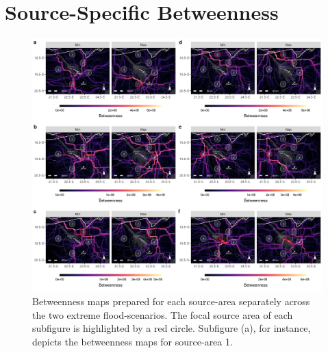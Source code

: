 \documentclass[abstract=on,10pt,a4paper,bibliography=totocnumbered]{article}
\begin{document}
\section{Source-Specific Betweenness}
\begin{figure}[htbp]
  \begin{center}
  \includegraphics[width = \textwidth]{99_BetweennessIndividual.png}
  \caption{Betweenness maps prepared for each source-area separately across the
  two extreme flood-scenarios. The focal source area of each subfigure is
  highlighted by a red circle. Subfigure (a), for instance, depicts the
  betweenness maps for source-area 1.}
  \label{Betweenness}
  \end{center}
\end{figure}

\newpage
\end{document}

